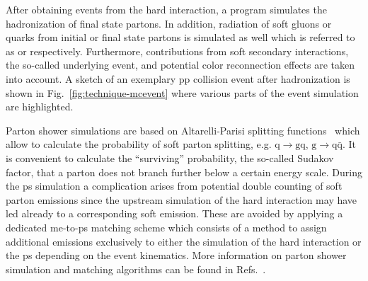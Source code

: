 After obtaining events from the hard interaction, a  program simulates the hadronization of final state partons. In addition, radiation of soft gluons or quarks from initial or final state partons is simulated as well which is referred to as  or  respectively. Furthermore, contributions from soft secondary interactions, the so-called underlying event, and potential color reconnection effects are taken into account. A sketch of an exemplary pp collision event after hadronization is shown in Fig.~\ref{fig:technique-mcevent} where various parts of the event simulation are highlighted. 

Parton shower simulations are based on Altarelli-Parisi splitting functions~\cite{Altarelli:1977zs} which allow to calculate the probability of soft parton splitting, e.g. $\mathrm{q}\to \mathrm{gq}$, $\mathrm{g}\to \mathrm{q}\bar{\mathrm{q}}$. It is convenient to calculate the ``surviving'' probability, the so-called Sudakov factor, that a parton does not branch further below a certain energy scale. During the \gls{ps} simulation a complication arises from potential double counting of soft parton emissions since the upstream simulation of the hard interaction may have led already to a corresponding soft emission. These are avoided by applying a dedicated \gls{me}-to-\gls{ps} matching scheme which consists of a method to assign additional emissions exclusively to either the simulation of the hard interaction or the \gls{ps} depending on the event kinematics. More information on parton shower simulation and matching algorithms can be found in Refs.~\cite{Hoche:2014rga,Alwall:2007fs}.



